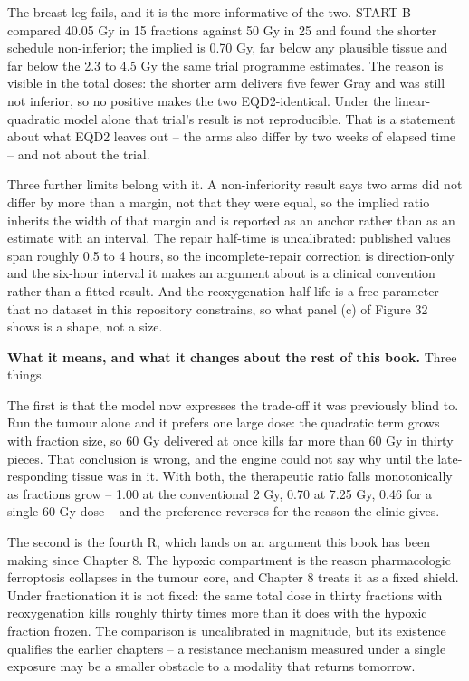 \documentclass[11pt,twoside,openright]{report}
\begin{document}
\begin{refusal}
The breast leg fails, and it is the more informative of the two. START-B compared 40.05 Gy in 15 fractions against 50 Gy in 25 and found the shorter schedule non-inferior; the implied  is 0.70 Gy, far below any plausible tissue and far below the 2.3 to 4.5 Gy the same trial programme estimates. The reason is visible in the total doses: the shorter arm delivers five fewer Gray and was still not inferior, so no positive  makes the two EQD2-identical. Under the linear-quadratic model alone that trial's result is not reproducible. That is a statement about what EQD2 leaves out -- the arms also differ by two weeks of elapsed time -- and not about the trial.

Three further limits belong with it. A non-inferiority result says two arms did not differ by more than a margin, not that they were equal, so the implied ratio inherits the width of that margin and is reported as an anchor rather than as an estimate with an interval. The repair half-time is uncalibrated: published values span roughly 0.5 to 4 hours, so the incomplete-repair correction is direction-only and the six-hour interval it makes an argument about is a clinical convention rather than a fitted result. And the reoxygenation half-life is a free parameter that no dataset in this repository constrains, so what panel (c) of Figure 32 shows is a shape, not a size.
\end{refusal}

\textbf{What it means, and what it changes about the rest of this book.} Three things.

The first is that the model now expresses the trade-off it was previously blind to. Run the tumour alone and it prefers one large dose: the quadratic term grows with fraction size, so 60 Gy delivered at once kills far more than 60 Gy in thirty pieces. That conclusion is wrong, and the engine could not say why until the late-responding tissue was in it. With both, the therapeutic ratio falls monotonically as fractions grow -- 1.00 at the conventional 2 Gy, 0.70 at 7.25 Gy, 0.46 for a single 60 Gy dose -- and the preference reverses for the reason the clinic gives.

The second is the fourth R, which lands on an argument this book has been making since Chapter 8. The hypoxic compartment is the reason pharmacologic ferroptosis collapses in the tumour core, and Chapter 8 treats it as a fixed shield. Under fractionation it is not fixed: the same total dose in thirty fractions with reoxygenation kills roughly thirty times more than it does with the hypoxic fraction frozen. The comparison is uncalibrated in magnitude, but its existence qualifies the earlier chapters -- a resistance mechanism measured under a single exposure may be a smaller obstacle to a modality that returns tomorrow.
\end{document}
